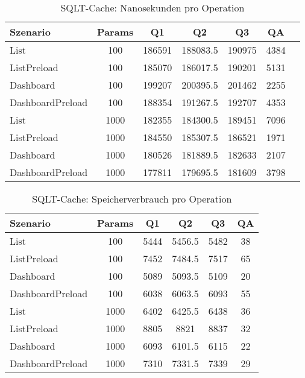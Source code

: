 
\begin{table}[ht]
\centering
\caption{SQLT-Cache: Nanosekunden pro Operation}
\begin{tabular}{lcccccc}
\toprule
Szenario & Params & Q1 & Q2 & Q3 & QA \\
\midrule
	List & 100 & 186591 & 188083.5 & 190975 & 4384 \\
	ListPreload & 100 & 185070 & 186017.5 & 190201 & 5131 \\
	Dashboard & 100 & 199207 & 200395.5 & 201462 & 2255 \\
	DashboardPreload & 100 & 188354 & 191267.5 & 192707 & 4353 \\
	List & 1000 & 182355 & 184300.5 & 189451 & 7096 \\
	ListPreload & 1000 & 184550 & 185307.5 & 186521 & 1971 \\
	Dashboard & 1000 & 180526 & 181889.5 & 182633 & 2107 \\
	DashboardPreload & 1000 & 177811 & 179695.5 & 181609 & 3798 \\
\bottomrule
\end{tabular}
\label{tab:benchmark_sqlt-cache_nsperop}
\end{table}
	
\begin{table}[ht]
\centering
\caption{SQLT-Cache: Speicherverbrauch pro Operation}
\begin{tabular}{lccccc}
\toprule
Szenario & Params & Q1 & Q2 & Q3 & QA \\
\midrule
	List & 100 & 5444 & 5456.5 & 5482 & 38 \\
	ListPreload & 100 & 7452 & 7484.5 & 7517 & 65 \\
	Dashboard & 100 & 5089 & 5093.5 & 5109 & 20 \\
	DashboardPreload & 100 & 6038 & 6063.5 & 6093 & 55 \\
	List & 1000 & 6402 & 6425.5 & 6438 & 36 \\
	ListPreload & 1000 & 8805 & 8821 & 8837 & 32 \\
	Dashboard & 1000 & 6093 & 6101.5 & 6115 & 22 \\
	DashboardPreload & 1000 & 7310 & 7331.5 & 7339 & 29 \\
\bottomrule
\end{tabular}
\label{tab:benchmark_sqlt-cache_bytesperop}
\end{table}
	
